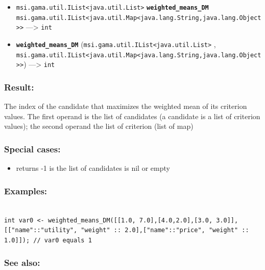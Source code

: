 \documentclass[]{book}
\providecommand{\tightlist}{%
  \setlength{\itemsep}{0pt}\setlength{\parskip}{0pt}}
\theoremstyle{definition}
\theoremstyle{definition}
\theoremstyle{definition}
\theoremstyle{remark}
\begin{document}
\begin{itemize}
\tightlist
\item
  \texttt{msi.gama.util.IList\textless{}java.util.List\textgreater{}}
  \textbf{\texttt{weighted\_means\_DM}}
  \texttt{msi.gama.util.IList\textless{}java.util.Map\textless{}java.lang.String,java.lang.Object\textgreater{}\textgreater{}}
  ---\textgreater{} \texttt{int}
\item
  \textbf{\texttt{weighted\_means\_DM}}
  (\texttt{msi.gama.util.IList\textless{}java.util.List\textgreater{}} ,
  \texttt{msi.gama.util.IList\textless{}java.util.Map\textless{}java.lang.String,java.lang.Object\textgreater{}\textgreater{}})
  ---\textgreater{} \texttt{int}
\end{itemize}

\subsubsection{Result:}\label{result-533}

The index of the candidate that maximizes the weighted mean of its
criterion values. The first operand is the list of candidates (a
candidate is a list of criterion values); the second operand the list of
criterion (list of map)

\subsubsection{Special cases:}\label{special-cases-145}

\begin{itemize}
\tightlist
\item
  returns -1 is the list of candidates is nil or empty
\end{itemize}

\subsubsection{Examples:}\label{examples-381}

\begin{verbatim}
 
int var0 <- weighted_means_DM([[1.0, 7.0],[4.0,2.0],[3.0, 3.0]], [["name"::"utility", "weight" :: 2.0],["name"::"price", "weight" :: 1.0]]); // var0 equals 1
\end{verbatim}

\subsubsection{See also:}\label{see-also-219}
\end{document}
